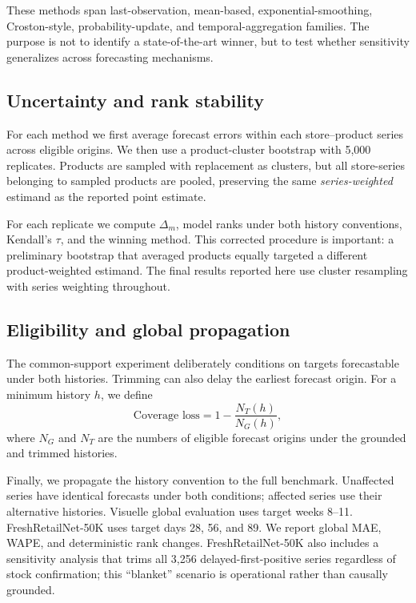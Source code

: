 These methods span last-observation, mean-based, exponential-smoothing, Croston-style, probability-update, and temporal-aggregation families. The purpose is not to identify a state-of-the-art winner, but to test whether sensitivity generalizes across forecasting mechanisms.

\subsection{Uncertainty and rank stability}

For each method we first average forecast errors within each store--product series across eligible origins. We then use a product-cluster bootstrap with 5,000 replicates. Products are sampled with replacement as clusters, but all store-series belonging to sampled products are pooled, preserving the same \emph{series-weighted} estimand as the reported point estimate.

For each replicate we compute $\Delta_m$, model ranks under both history conventions, Kendall's $\tau$, and the winning method. This corrected procedure is important: a preliminary bootstrap that averaged products equally targeted a different product-weighted estimand. The final results reported here use cluster resampling with series weighting throughout.

\subsection{Eligibility and global propagation}

The common-support experiment deliberately conditions on targets forecastable under both histories. Trimming can also delay the earliest forecast origin. For a minimum history $h$, we define
\begin{equation}
\text{Coverage loss}
=
1-\frac{N_T(h)}{N_G(h)},
\end{equation}
where $N_G$ and $N_T$ are the numbers of eligible forecast origins under the grounded and trimmed histories.

Finally, we propagate the history convention to the full benchmark. Unaffected series have identical forecasts under both conditions; affected series use their alternative histories. Visuelle global evaluation uses target weeks 8--11. FreshRetailNet-50K uses target days 28, 56, and 89. We report global MAE, WAPE, and deterministic rank changes. FreshRetailNet-50K also includes a sensitivity analysis that trims all 3,256 delayed-first-positive series regardless of stock confirmation; this ``blanket'' scenario is operational rather than causally grounded.

